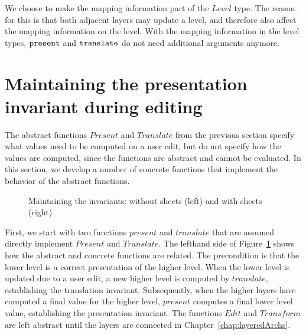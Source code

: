 

We choose to make the mapping information part of the $Level$ type. The reason for this is that both adjacent layers may update a level, and therefore also affect the mapping information on the level.  With the mapping information in the level types, ${\tt present}$ and ${\tt translate}$ do not need additional arguments anymore.
\ec



%																
%																
%																
\section{Maintaining the presentation invariant during editing}   \label{sect:maintainingInv}

The abstract functions $Present$ and $Translate$ from the previous section specify what values need to be computed on a user edit, but do not specify how the values are computed, since the functions are abstract and cannot be evaluated. In this section, we develop a number of concrete  functions that implement the behavior of the abstract functions.

\begin{figure}
\begin{center}
\begin{center}
 
\end{center}
\caption{Maintaining the invariants: without sheets (left) and with sheets (right)}\label{maintainingInvs} 
\end{center}
\end{figure}

First, we start with two functions $present$ and $translate$ that are assumed directly implement $Present$ and $Translate$. The lefthand side of Figure~\ref{maintainingInvs} shows how the abstract and concrete functions are related. The precondition is that the lower level is a correct presentation of the higher level. When the lower level is updated due to a user edit, a new higher level is computed by $translate$, establishing the translation invariant. Subsequently, when the higher layers have computed a final value for the higher level, $present$ computes a final lower level value, establishing the presentation invariant. The functions $Edit$ and $Transform$ are left abstract until the layers are connected in Chapter~\ref{chap:layeredArchs}.

